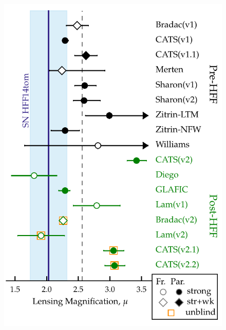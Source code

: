 

\begin{figure}
\begin{center}
\includegraphics[width=\columnwidth]{FIG/snTomas_magnifications}

\end{center}
\end{figure}
